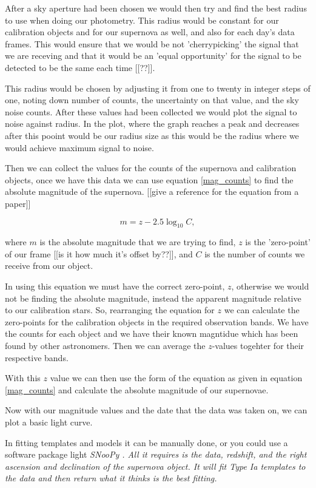 \documentclass[twocolumn]{revtex4}
\begin{document}
After a sky aperture had been chosen we would then try and find the best radius to use when doing our photometry. This radius would be constant for our calibration objects and for our supernova as well, and also for each day's data frames. This would ensure that we would be not 'cherrypicking' the signal that we are receving and that it would be an 'equal opportunity' for the signal to be detected to be the same each time [[??]]. 

This radius would be chosen by adjusting it from one to twenty in integer steps of one, noting down number of counts, the uncertainty on that value, and the sky noise counts. After these values had been collected we would plot the signal to noise against radius. In the plot, where the graph reaches a peak and decreases after this pooint would be our radius size as this would be the radius where we would achieve maximum signal to noise.

Then we can collect the values for the counts of the supernova and calibration objects, once we have this data we can use equation \ref{mag_counts} to find the absolute magnitude of the supernova. [[give a reference for the equation from a paper]]

\begin{equation}
    m = z - 2.5 \log_{10}{C},
\label{mag_counts}
\end{equation}

where $m$ is the absolute magnitude that we are trying to find, $z$ is the 'zero-point' of our frame [[is it how much it's offset by??]], and $C$ is the number of counts we receive from our object.

In using this equation we must have the correct zero-point, $z$, otherwise we would not be finding the absolute magnitude, instead the apparent magnitude relative to our calibration stars. So, rearranging the equation for $z$ we can calculate the zero-points for the calibration objects in the required observation bands. We have the counts for each object and we have their known magntidue which has been found by other astronomers. Then we can average the $z$-values togehter for their respective bands. 

With this $z$ value we can then use the form of the equation as given in equation \ref{mag_counts} and calculate the absolute magnitude of our supernovae.

Now with our magnitude values and the date that the data was taken on, we can plot a basic light curve. 

In fitting templates and models it can be manually done, or you could use a software package light \em{SNooPy }\em. All it requires is the data, redshift, and the right ascension and declination of the supernova object. It will fit Type Ia templates to the data and then return what it thinks is the best fitting.
\end{document}

